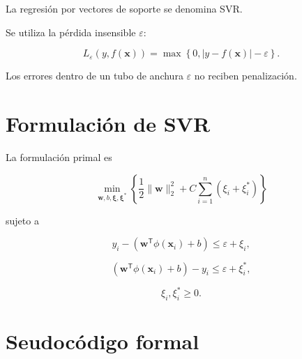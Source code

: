 \documentclass[
  spanish,
  10.5pt,
  letterpaper,
  DIV=11,
  numbers=noendperiod,
  oneside,
  open=any]{scrreprt}
\theoremstyle{definition}
\theoremstyle{definition}
\theoremstyle{plain}
\theoremstyle{remark}
\begin{document}

La regresión por vectores de soporte se denomina SVR.

Se utiliza la pérdida insensible \(\varepsilon\):

\[
L_\varepsilon
(y,f(\mathbf{x}))
=
\max
\left\{
0,
|y-f(\mathbf{x})|-\varepsilon
\right\}.
\]

Los errores dentro de un tubo de anchura \(\varepsilon\) no reciben
penalización.

\section*{Formulación de SVR}\label{formulaciuxf3n-de-svr}


La formulación primal es

\[
\min_{\mathbf{w},b,\boldsymbol{\xi},\boldsymbol{\xi}^{*}}
\left\{
\frac{1}{2}\|\mathbf{w}\|_2^2
+
C
\sum_{i=1}^{n}
(\xi_i+\xi_i^*)
\right\}
\]

sujeto a

\[
y_i-
\left(
\mathbf{w}^{\mathsf T}\phi(\mathbf{x}_i)+b
\right)
\leq
\varepsilon+\xi_i,
\]

\[
\left(
\mathbf{w}^{\mathsf T}\phi(\mathbf{x}_i)+b
\right)
-y_i
\leq
\varepsilon+\xi_i^*,
\]

\[
\xi_i,\xi_i^*\geq 0.
\]

\section*{Seudocódigo formal}\label{seudocuxf3digo-formal-6}

\end{document}
